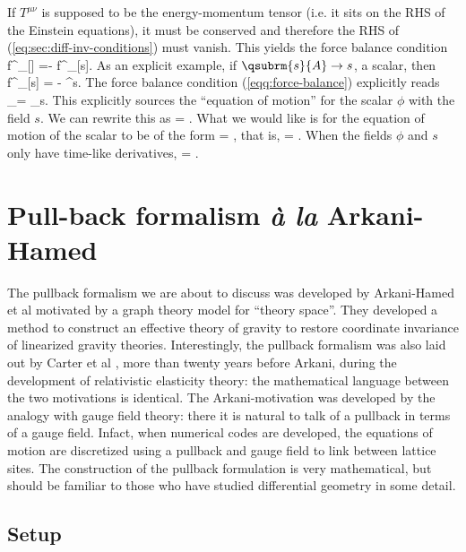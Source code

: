If $T^{\mu\nu}$ is supposed to be the energy-momentum tensor (i.e. it sits on the RHS of the Einstein equations), it must be conserved and therefore the RHS of (\ref{eq:sec:diff-inv-conditions}) must vanish. This yields the force balance condition
\bea
\label{eqq:force-balance}
f^{\nu}_{[\phi]} =- f^{\nu}_{[s]}.
\eea
As an explicit example, if $\qsubrm{s}{A} \rightarrow s$, a scalar, then 
\bea
f^{\mu}_{[s]} =   -   {}\nabla^{\mu}s.
\eea
The force balance condition (\ref{eqq:force-balance}) explicitly reads
\bea
{} \nabla_{\mu}\phi  =   {}\nabla_{\mu}s.
\eea
This explicitly sources the ``equation of motion'' for  the scalar $\phi$ with the field $s$.
We can rewrite this as
\bea
{} =  .
\eea
What we would like is for the equation of motion of the scalar  to be of the form
\bea
{} = \alpha\dot{\phi},
\eea
that is,
\bea
\alpha \dot{\phi} =   .
\eea
When the fields $\phi$ and $s$ only have time-like derivatives,
\bea
{} = \alpha.
\eea
\section{Pull-back formalism \textit{\`a la} Arkani-Hamed}
The pullback formalism we are about to discuss was developed by Arkani-Hamed et al \cite{ArkaniHamed:2001ed, ArkaniHamed:2002sp} motivated by a graph theory model for ``theory space''. They developed a method to construct an effective theory of gravity to restore coordinate invariance of linearized gravity theories. Interestingly, the pullback formalism was also laid out by Carter et al \cite{Carter26081980, Carter21111972}, more than twenty years before Arkani, during the development of relativistic elasticity theory: the mathematical language between the two motivations is identical. The Arkani-motivation was developed by the analogy with gauge field theory: there it is natural to talk of a pullback in terms of a gauge field. Infact, when numerical codes are developed, the equations of motion are discretized using a pullback and gauge field to link between lattice sites. The construction of the pullback formulation is very mathematical, but should be familiar to those who have studied differential geometry in some detail.

\subsection{Setup}

